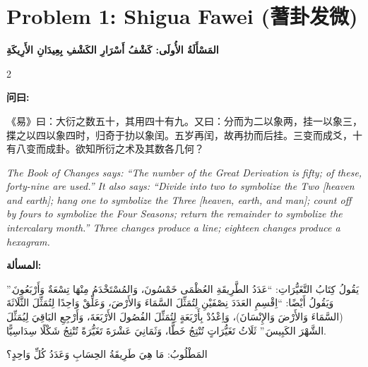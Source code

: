 \documentclass[11pt,a4paper]{article}
\newcommand{\ar}[1]{\arabicfont\beginR #1\endR}
\providecommand{\enquote}[1]{``#1''}
\newcommand{\zhtext}[1]{{\chinese #1}}
\newenvironment{bilingual}{%
  \begin{paracol}{2}
}{%
  \end{paracol}
}
\newcommand{\cnlabel}[1]{\textcolor{algocolor}{\textbf{#1}}}
\newcommand{\arlabel}[1]{\ar{\textcolor{algocolor}{\textbf{#1}}}}
\begin{document}
\newpage

\section{Problem 1: Shigua Fawei (\zhtext{蓍卦发微})}
\ar{\textbf{المَسْأَلَةُ الأُولَى: كَشْفُ أَسْرَارِ الكَشْفِ بِعِيدَانِ الأَرِيكَةِ}}

\begin{bilingual}

\begin{leftcolumn*}
\cnlabel{问曰:}

《易》曰：大衍之数五十，其用四十有九。又曰：分而为二以象两，挂一以象三，揲之以四以象四时，归奇于扐以象闰。五岁再闰，故再扐而后挂。三变而成爻，十有八变而成卦。欲知所衍之术及其数各几何？

\medskip

\textit{The Book of Changes says: ``The number of the Great Derivation is fifty; of these, forty-nine are used.'' It also says: ``Divide into two to symbolize the Two [heaven and earth]; hang one to symbolize the Three [heaven, earth, and man]; count off by fours to symbolize the Four Seasons; return the remainder to symbolize the intercalary month.'' Three changes produce a line; eighteen changes produce a hexagram.}
\end{leftcolumn*}

\begin{rightcolumn*}
\arlabel{المسألة:}

\ar{يَقُولُ كِتَابُ التَّغَيُّرَاتِ: \enquote{عَدَدُ الطَّرِيقَةِ العُظْمَى خَمْسُونَ، وَالمُسْتَخْدَمُ مِنْهَا تِسْعَةٌ وَأَرْبَعُونَ.} وَيَقُولُ أَيْضًا: \enquote{اِقْسِمِ العَدَدَ نِصْفَيْنِ لِتُمَثِّلَ السَّمَاءَ وَالأَرْضَ، وَعَلِّقْ وَاحِدًا لِتُمَثِّلَ الثَّلَاثَةَ (السَّمَاءَ وَالأَرْضَ وَالإِنْسَانَ)، وَاِعْدُدْ بِأَرْبَعَةٍ لِتُمَثِّلَ الفُصُولَ الأَرْبَعَةَ، وَأَرْجِعِ البَاقِيَ لِيُمَثِّلَ الشَّهْرَ الكَبِيسَ.} ثَلَاثُ تَغَيُّرَاتٍ تُنْتِجُ خَطًّا، وَثَمَانِيَ عَشْرَةَ تَغَيُّرَةً تُنْتِجُ شَكْلًا سِدَاسِيًّا.}

\ar{المَطْلُوبُ: مَا هِيَ طَرِيقَةُ الحِسَابِ وَعَدَدُ كُلِّ وَاحِدٍ؟}
\end{rightcolumn*}

\end{bilingual}

\vspace{1em}
\end{document}
